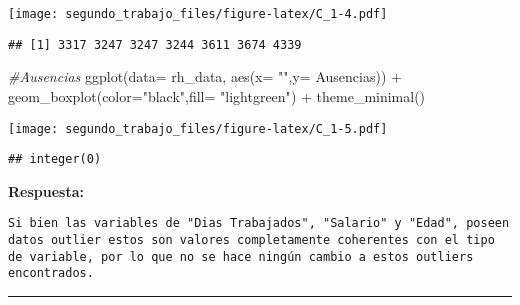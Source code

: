 \documentclass[
]{article}
\newenvironment{Shaded}{\begin{snugshade}}{\end{snugshade}}
\newcommand{\AttributeTok}[1]{\textcolor[rgb]{0.77,0.63,0.00}{#1}}
\newcommand{\CommentTok}[1]{\textcolor[rgb]{0.56,0.35,0.01}{\textit{#1}}}
\newcommand{\FunctionTok}[1]{\textcolor[rgb]{0.00,0.00,0.00}{#1}}
\newcommand{\NormalTok}[1]{#1}
\newcommand{\SpecialCharTok}[1]{\textcolor[rgb]{0.00,0.00,0.00}{#1}}
\newcommand{\StringTok}[1]{\textcolor[rgb]{0.31,0.60,0.02}{#1}}
\begin{document}
\texttt{[image: segundo\_trabajo\_files/figure-latex/C\_1-4.pdf]}

\begin{Shaded}
\end{Shaded}

\begin{verbatim}
## [1] 3317 3247 3247 3244 3611 3674 4339
\end{verbatim}

\begin{Shaded}
\begin{Highlighting}[]
\CommentTok{\#Ausencias}
\FunctionTok{ggplot}\NormalTok{(}\AttributeTok{data=}\NormalTok{ rh\_data, }\FunctionTok{aes}\NormalTok{(}\AttributeTok{x=} \StringTok{""}\NormalTok{,}\AttributeTok{y=}\NormalTok{ Ausencias)) }\SpecialCharTok{+} \FunctionTok{geom\_boxplot}\NormalTok{(}\AttributeTok{color=}\StringTok{"black"}\NormalTok{,}\AttributeTok{fill=} \StringTok{"lightgreen"}\NormalTok{) }\SpecialCharTok{+} 
\FunctionTok{theme\_minimal}\NormalTok{()}
\end{Highlighting}
\end{Shaded}

\texttt{[image: segundo\_trabajo\_files/figure-latex/C\_1-5.pdf]}

\begin{Shaded}
\end{Shaded}

\begin{verbatim}
## integer(0)
\end{verbatim}

\textbf{Respuesta:}

\begin{verbatim}
Si bien las variables de "Dias Trabajados", "Salario" y "Edad", poseen datos outlier estos son valores completamente coherentes con el tipo de variable, por lo que no se hace ningún cambio a estos outliers encontrados.
\end{verbatim}

\begin{center}\rule{0.5\linewidth}{0.5pt}\end{center}
\end{document}
